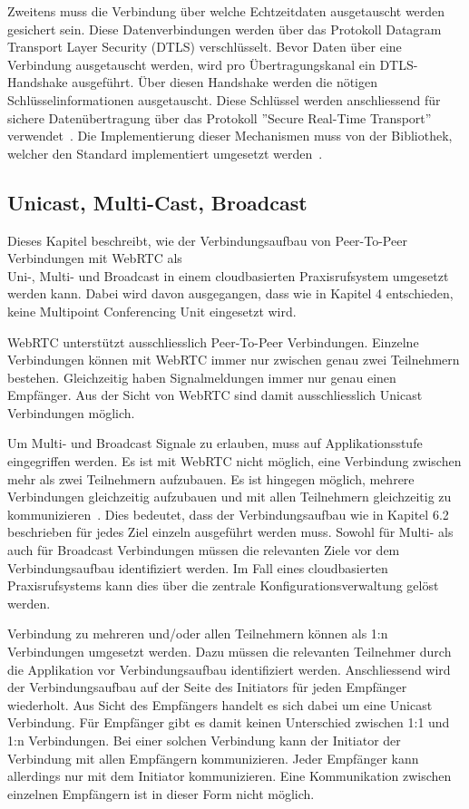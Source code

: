 Zweitens muss die Verbindung über welche Echtzeitdaten ausgetauscht werden gesichert sein.
Diese Datenverbindungen werden über das Protokoll Datagram Transport Layer Security (DTLS) verschlüsselt.
Bevor Daten über eine Verbindung ausgetauscht werden, wird pro Übertragungskanal ein DTLS-Handshake ausgeführt.
Über diesen Handshake werden die nötigen Schlüsselinformationen ausgetauscht.
Diese Schlüssel werden anschliessend für sichere Datenübertragung über das Protokoll ''Secure Real-Time Transport'' verwendet~\cite{rfc_8827_webRTC_SecurityArchitecture}.
Die Implementierung dieser Mechanismen muss von der Bibliothek, welcher den Standard implementiert umgesetzt werden~\cite{webrtc_spec}.

\subsection{Unicast, Multi-Cast, Broadcast}

Dieses Kapitel beschreibt, wie der Verbindungsaufbau von Peer-To-Peer Verbindungen mit WebRTC als \\Uni-, Multi- und Broadcast in einem cloudbasierten Praxisrufsystem umgesetzt werden kann.
Dabei wird davon ausgegangen, dass wie in Kapitel 4 entschieden, keine Multipoint Conferencing Unit eingesetzt wird.

WebRTC unterstützt ausschliesslich Peer-To-Peer Verbindungen.
Einzelne Verbindungen können mit WebRTC immer nur zwischen genau zwei Teilnehmern bestehen.
Gleichzeitig haben Signalmeldungen immer nur genau einen Empfänger.
Aus der Sicht von WebRTC sind damit ausschliesslich Unicast Verbindungen möglich.

Um Multi- und Broadcast Signale zu erlauben, muss auf Applikationsstufe eingegriffen werden.
Es ist mit WebRTC nicht möglich, eine Verbindung zwischen mehr als zwei Teilnehmern aufzubauen.
Es ist hingegen möglich, mehrere Verbindungen gleichzeitig aufzubauen und mit allen Teilnehmern gleichzeitig zu kommunizieren~\cite{webrtc_mesh}.
Dies bedeutet, dass der Verbindungsaufbau wie in Kapitel 6.2 beschrieben für jedes Ziel einzeln ausgeführt werden muss.
Sowohl für Multi- als auch für Broadcast Verbindungen müssen die relevanten Ziele vor dem Verbindungsaufbau identifiziert werden.
Im Fall eines cloudbasierten Praxisrufsystems kann dies über die zentrale Konfigurationsverwaltung gelöst werden.

Verbindung zu mehreren und/oder allen Teilnehmern können als 1:n Verbindungen umgesetzt werden.
Dazu müssen die relevanten Teilnehmer durch die Applikation vor Verbindungsaufbau identifiziert werden.
Anschliessend wird der Verbindungsaufbau auf der Seite des Initiators für jeden Empfänger wiederholt.
Aus Sicht des Empfängers handelt es sich dabei um eine Unicast Verbindung.
Für Empfänger gibt es damit keinen Unterschied zwischen 1:1 und 1:n Verbindungen.
Bei einer solchen Verbindung kann der Initiator der Verbindung mit allen Empfängern kommunizieren.
Jeder Empfänger kann allerdings nur mit dem Initiator kommunizieren.
Eine Kommunikation zwischen einzelnen Empfängern ist in dieser Form nicht möglich.

